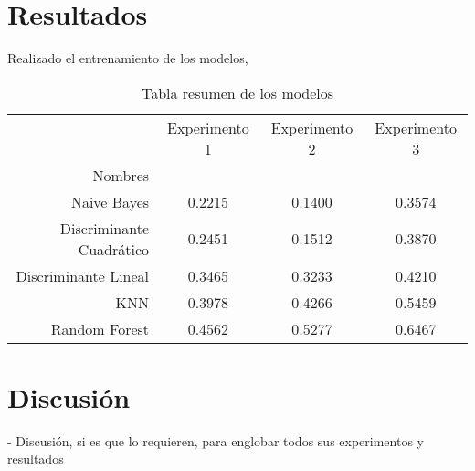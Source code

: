 \section{Resultados}
Realizado el entrenamiento de los modelos, 


\begin{table}
\centering
\caption{Tabla resumen de los modelos}
\label{tab:resumen-exp}
\begin{tabular}{rccc}
\toprule
{} &  Experimento 1 &  Experimento 2 &  Experimento 3 \\
Nombres                  &                &                &                \\
\midrule
Naive Bayes              &         0.2215 &         0.1400 &         0.3574 \\
Discriminante Cuadrático &         0.2451 &         0.1512 &         0.3870 \\
Discriminante Lineal     &         0.3465 &         0.3233 &         0.4210 \\
KNN                      &         0.3978 &         0.4266 &         0.5459 \\
Random Forest            &         0.4562 &         0.5277 &         0.6467 \\
\bottomrule
\end{tabular}
\end{table}

\section{Discusión}

- Discusión, si es que lo requieren, para englobar todos sus experimentos y resultados
